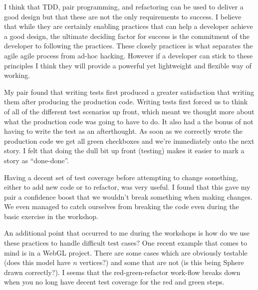 \documentclass[paper=a4, fontsize=11pt]{scrartcl}	%
\numberwithin{equation}{section}															%
\numberwithin{figure}{section}																%
\numberwithin{table}{section}
\begin{document}
I think that TDD, pair programming, and refactoring can be used to deliver a good design but that these are not the only requirements to success. I believe that while they are certainly enabling practices that can help a developer achieve a good design, the ultimate deciding factor for success is the commitment of the developer to following the practices. These closely practices is what separates the agile agile process from ad-hoc hacking. However if a developer can stick to these principles I think they will provide a powerful yet lightweight and flexible way of working.

My pair found that writing tests first produced a greater satisfaction that writing them after producing the production code. Writing tests first forced us to think of all of the different test scenarios up front, which meant we thought more about what the production code was going to have to do. It also had a the bonus of not having to write the test as an afterthought. As soon as we correctly wrote the production code we get all green checkboxes and we're immediately onto the next story. I felt that doing the dull bit up front (testing) makes it easier to mark a story as ``done-done''.

Having a decent set of test coverage before attempting to change something, either to add new code or to refactor, was very useful. I found that this gave my pair a confidence boost that we wouldn't break something when making changes. We even managed to catch ourselves from breaking the code even during the basic exercise in the workshop.

An additional point that occurred to me during the workshops is how do we use these practices to handle difficult test cases? One recent example that comes to mind is in a WebGL project. There are some cases which are obviously testable (does this model have $n$ vertices?) and some that are not (is this being Sphere drawn correctly?). I seems that the red-green-refactor work-flow breaks down when you no long have decent test coverage for the red and green steps.

\clearpage


\end{document}
